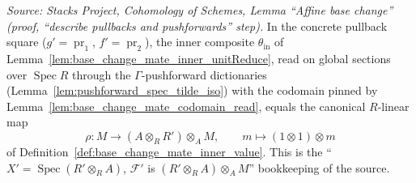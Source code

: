 \begin{lemma}

  \label{lem:base_change_mate_inner_value_eq}
  \textit{Source: Stacks Project, Cohomology of Schemes, Lemma ``Affine base change''
  (proof, ``describe pullbacks and pushforwards'' step).}
  In the concrete pullback square (\(g' = \operatorname{pr}_1\), \(f' = \operatorname{pr}_2\)),
  the inner composite \(\theta_{\mathrm{in}}\) of
  Lemma~\ref{lem:base_change_mate_inner_unitReduce}, read on global sections over
  \(\operatorname{Spec} R\) through the \(\Gamma\)-pushforward dictionaries
  (Lemma~\ref{lem:pushforward_spec_tilde_iso}) with the codomain pinned by
  Lemma~\ref{lem:base_change_mate_codomain_read}, equals the canonical \(R\)-linear map
  \[
    \rho : M \longrightarrow (A \otimes_R R') \otimes_A M, \qquad m \longmapsto (1 \otimes 1)\otimes m
  \]
  of Definition~\ref{def:base_change_mate_inner_value}. This is the
  ``\(X' = \operatorname{Spec}(R' \otimes_R A)\), \(\mathcal{F}'\) is
  \((R' \otimes_R A) \otimes_A M\)'' bookkeeping of the source.
\end{lemma}
